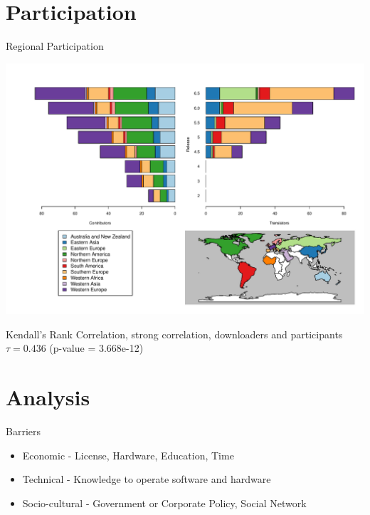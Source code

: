 \documentclass{beamer}
\begin{document}
\section{Participation}
\begin{frame}{Regional Participation}
\vspace{-.3in}
	\begin{center}
		\includegraphics[width=1\textwidth]{RegionalParticipation.pdf}
		
	
	Kendall's Rank Correlation, strong correlation, downloaders and participants $\tau = 0.436$ (p-value = 3.668e-12)	
	\end{center}
	
\end{frame}

\section{Analysis}

\begin{frame}{Barriers}
	\begin{itemize}
		\item Economic - License, Hardware, Education, Time
		\item Technical - Knowledge to operate software and hardware
		\item Socio-cultural - Government or Corporate Policy, Social Network 
	\end{itemize}
\end{frame}
\end{document}
